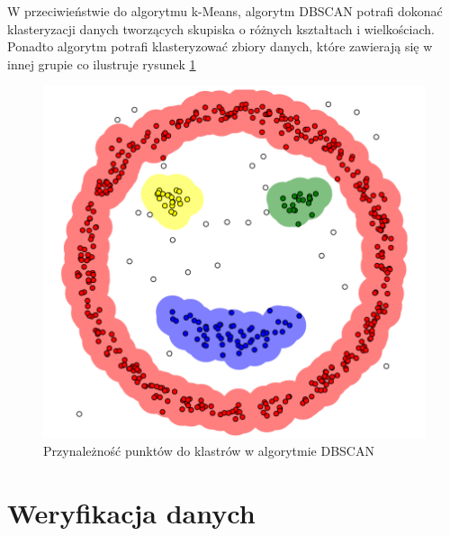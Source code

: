     W przeciwieństwie do algorytmu k-Means, algorytm DBSCAN potrafi dokonać klasteryzacji danych tworzących skupiska o różnych kształtach i wielkościach. Ponadto algorytm potrafi klasteryzować zbiory danych, które zawierają się w innej grupie co ilustruje rysunek \ref{fig:dbscan}
    \begin{figure}[h!]
        \centering
    \includegraphics[width=0.6\linewidth]{Rysunki/Rozdzial2/dbscan.png}
    \caption{Przynależność punktów do klastrów w algorytmie DBSCAN}
    \label{fig:dbscan}
    \end{figure}
    
    
\section{Weryfikacja danych}

